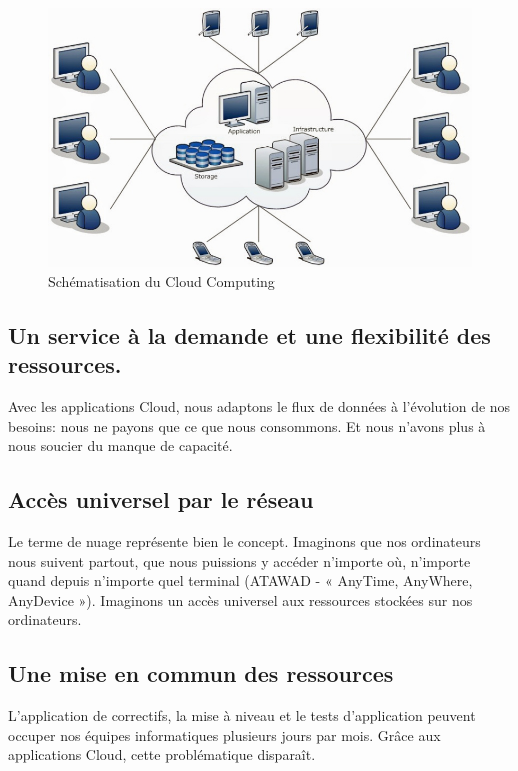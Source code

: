   \begin{figure}
    \begin{center}
      \includegraphics[scale=0.3]{images/CloudComputing.png}
    \end{center}
    \caption{Schématisation du Cloud Computing}
    \label{Cloud Computing}
  \end{figure}

  \subsection{Un service à la demande et une flexibilité des ressources.}
  Avec les applications Cloud, nous adaptons le flux de données à l'évolution de nos besoins: nous ne payons que ce que nous consommons. Et nous n'avons plus à nous soucier du manque de capacité.

  \subsection{Accès universel par le réseau}
  Le terme de nuage représente bien le concept. Imaginons que nos ordinateurs nous suivent partout, que nous puissions y accéder n’importe où, n’importe quand depuis n’importe quel terminal (ATAWAD - « AnyTime, AnyWhere, AnyDevice »). Imaginons un accès universel aux ressources stockées sur nos ordinateurs.

  \subsection{Une mise en commun des ressources}
  L'application de correctifs, la mise à niveau et le tests d'application peuvent occuper nos équipes informatiques plusieurs jours par mois. Grâce aux applications Cloud, cette problématique disparaît.\\

